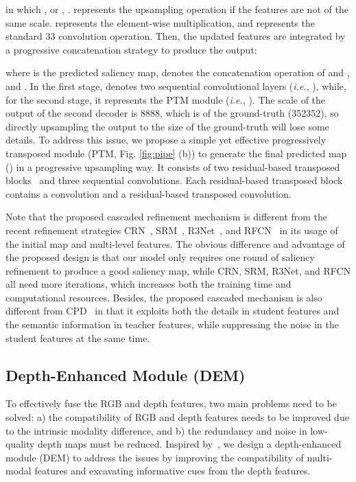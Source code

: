 \documentclass[journal]{IEEEtran}
\newcommand{\figref}[1]{Fig. \ref{#1}}
\def\ie{\emph{i.e.}}
\begin{document}
in which ,  or , .  represents the upsampling operation if the features are not of the same scale.  represents the element-wise multiplication, and  represents the standard 33 convolution operation. Then, the updated features are integrated by a progressive concatenation strategy to produce the output:

where  is the predicted saliency map,  denotes the concatenation operation of  and , and . In the first stage,  denotes two sequential convolutional layers (\ie, ), while, for the second stage, it represents the PTM module (\ie, ). 
The scale of the output of the second decoder is 8888, which is  of the ground-truth (352352), so directly upsampling the output to the size of the ground-truth will lose some details.
To address this issue, we propose a simple yet effective progressively transposed module (PTM, \figref{fig:pipe} (b)) to generate the final predicted map () in a progressive upsampling way.
It consists of two residual-based transposed blocks~\cite{2019huAcnet} and three sequential  convolutions.
Each residual-based transposed block contains a  convolution and a residual-based transposed convolution.

Note that the proposed cascaded refinement mechanism is different from the recent refinement strategies CRN~\cite{chen2017photographic}, SRM~\cite{WangBZZL17}, R3Net~\cite{deng2018r3net}, and RFCN~\cite{wang2018salient} in its usage of the initial map and multi-level features.
The obvious difference and advantage of the proposed design is that our model only requires one round of saliency refinement to produce a good saliency map, while CRN, SRM, R3Net, and RFCN all need more iterations, which increases both the training time and computational resources.
Besides, the proposed cascaded mechanism is also different from CPD~\cite{Wu2019CPD} in that it exploits both the details in student features and the semantic information in teacher features, while suppressing the noise in the student features at the same time. 
\subsection{Depth-Enhanced Module (DEM)}\label{sec:DEM}
To effectively fuse the RGB and depth features, two main problems need to be solved: a) the compatibility of RGB and depth features needs to be improved due to the intrinsic modality difference, and b) the redundancy and noise in low-quality depth maps must be reduced.
Inspired by~\cite{Woo2018CBAM}, we design a depth-enhanced module (DEM) to address the issues by improving the compatibility of multi-modal features and excavating informative cues from the depth features. 
\end{document}

